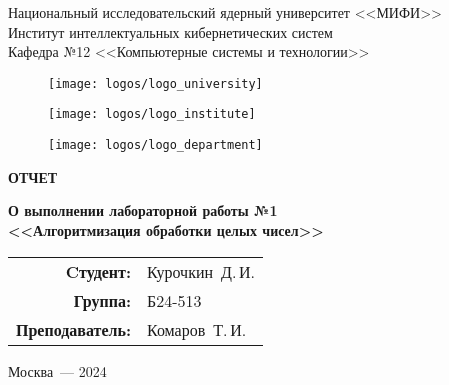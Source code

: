 \begin{titlepage}
  \begin{center}
    \begin{large}
      Национальный исследовательский ядерный университет <<МИФИ>> \\
      \vspace{0.25cm}
      Институт интеллектуальных кибернетических систем \\
      \vspace{0.25cm}
      Кафедра №12 <<Компьютерные системы и технологии>>
    \end{large}

    \vspace*{1cm}

    \begin{figure}[H]
      \centering
      \begin{minipage}[c]{0.3\textwidth}
        \texttt{[image: logos/logo\_university]}
      \end{minipage}
      \hfill
      \begin{minipage}[c]{0.3\textwidth}
        \texttt{[image: logos/logo\_institute]}
      \end{minipage}
      \hfill
      \begin{minipage}[c]{0.3\textwidth}
        \texttt{[image: logos/logo\_department]}
      \end{minipage}
    \end{figure}

    \vspace{4cm}

    \begin{huge}
      \textbf{ОТЧЕТ}
    \end{huge}

    \begin{large}
      \textbf{О выполнении лабораторной работы №1 \\
        <<Алгоритмизация обработки целых чисел>>}
    \end{large}

    \vfill

    \begin{flushright}
      \begin{tabular}{ r l }
        \textbf{Cтудент:} & Курочкин~Д.\,И. \\
        \textbf{Группа:} & Б24-513 \\
        \textbf{Преподаватель:} & Комаров~Т.\,И. \\
      \end{tabular}
    \end{flushright}

    Москва~--- 2024
  \end{center}
\end{titlepage}

